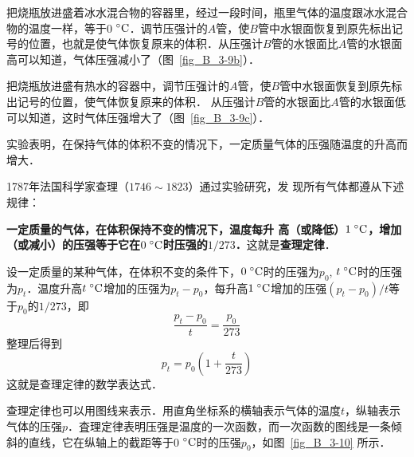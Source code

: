 把烧瓶放进盛着冰水混合物的容器里，经过一段时间，瓶里气体的温度跟冰水混合物的温度一样，等于0$\;{}^\circ\text{C}$．调节压强计的$A$管，使$B$管中水银面恢复到原先标出记号的位置，也就是使气体恢复原来的体积．从压强计$B$管的水银面比$A$管的水银面高可以知道，气体压强减小了（图~\ref{fig_B_3-9b}）．

把烧瓶放进盛有热水的容器中，调节压强计的$A$管，使$B$管中水银面恢复到原先标出记号的位置，使气体恢复原来的体积．
从压强计$B$管的水银面比$A$管的水银面低可以知道，这时气体压强增大了（图~\ref{fig_B_3-9c}）．

实验表明，在保持气体的体积不变的情况下，一定质量气体的压强随温度的升高而增大．

1787年法国科学家查理（$1746 \sim 1823$）通过实验研究，发
现所有气体都遵从下述规律：

\textbf{一定质量的气体，在体积保持不变的情况下，温度每升
高（或降低）$1 \;{}^\circ\text{C} $，增加（或减小）的压强等于它在$0 \;{}^\circ\text{C} $时压强的$1/273$．}这就是\textbf{查理定律}．

设一定质量的某种气体，在体积不变的条件下，$0 \;{}^\circ\text{C} $时的压强为$p_0$, $t \;{}^\circ\text{C} $时的压强为$p_t$．温度升高$t \;{}^\circ\text{C} $增加的压强为$p_t-p_0$，每升高$1 \;{}^\circ\text{C}$增加的压强$(p_t-p_0)/t$等于$p_0$的$1/273$，即
\[\frac{p_t-p_0}{t}=\frac{p_0}{273} \]
整理后得到
\[p_t=p_0 \left(1+\frac{t}{273}\right)\]
这就是查理定律的数学表达式．

查理定律也可以用图线来表示．用直角坐标系的横轴表示气体的温度$t$，纵轴表示气体的压强$p$．査理定律表明压强是温度的一次函数，而一次函数的图线是一条倾斜的直线，它在纵轴上的截距等于0$\;{}^\circ\text{C}$时的压强$p_0$，如图~\ref{fig_B_3-10} 所示．


